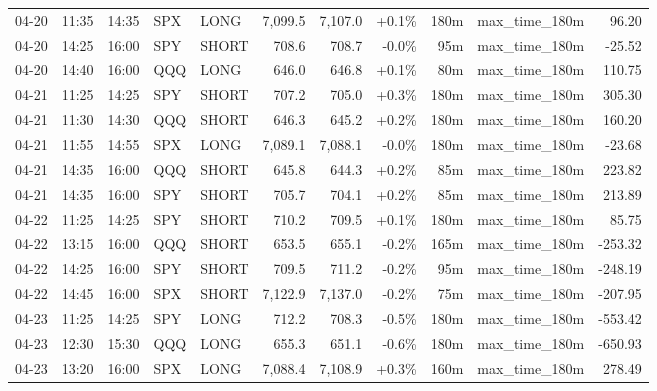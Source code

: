 \documentclass[11pt,a4paper,twoside]{article}
\begin{document}
\begin{center}
\begin{longtable}{>{\color{txtmain}}l l l l l r r r r >{\color{txtmain}}l r}
04-20 & 11:35 & 14:35 & SPX & LONG & 7,099.5 & 7,107.0 & \textcolor{wingreen}{+0.1\%} & 180m & max\_time\_180m & \textcolor{wingreen}{96.20} \\
04-20 & 14:25 & 16:00 & SPY & SHORT & 708.6 & 708.7 & \textcolor{lossred}{-0.0\%} & 95m & max\_time\_180m & \textcolor{lossred}{-25.52} \\
04-20 & 14:40 & 16:00 & QQQ & LONG & 646.0 & 646.8 & \textcolor{wingreen}{+0.1\%} & 80m & max\_time\_180m & \textcolor{wingreen}{110.75} \\
04-21 & 11:25 & 14:25 & SPY & SHORT & 707.2 & 705.0 & \textcolor{wingreen}{+0.3\%} & 180m & max\_time\_180m & \textcolor{wingreen}{305.30} \\
04-21 & 11:30 & 14:30 & QQQ & SHORT & 646.3 & 645.2 & \textcolor{wingreen}{+0.2\%} & 180m & max\_time\_180m & \textcolor{wingreen}{160.20} \\
04-21 & 11:55 & 14:55 & SPX & LONG & 7,089.1 & 7,088.1 & \textcolor{lossred}{-0.0\%} & 180m & max\_time\_180m & \textcolor{lossred}{-23.68} \\
04-21 & 14:35 & 16:00 & QQQ & SHORT & 645.8 & 644.3 & \textcolor{wingreen}{+0.2\%} & 85m & max\_time\_180m & \textcolor{wingreen}{223.82} \\
04-21 & 14:35 & 16:00 & SPY & SHORT & 705.7 & 704.1 & \textcolor{wingreen}{+0.2\%} & 85m & max\_time\_180m & \textcolor{wingreen}{213.89} \\
04-22 & 11:25 & 14:25 & SPY & SHORT & 710.2 & 709.5 & \textcolor{wingreen}{+0.1\%} & 180m & max\_time\_180m & \textcolor{wingreen}{85.75} \\
04-22 & 13:15 & 16:00 & QQQ & SHORT & 653.5 & 655.1 & \textcolor{lossred}{-0.2\%} & 165m & max\_time\_180m & \textcolor{lossred}{-253.32} \\
04-22 & 14:25 & 16:00 & SPY & SHORT & 709.5 & 711.2 & \textcolor{lossred}{-0.2\%} & 95m & max\_time\_180m & \textcolor{lossred}{-248.19} \\
04-22 & 14:45 & 16:00 & SPX & SHORT & 7,122.9 & 7,137.0 & \textcolor{lossred}{-0.2\%} & 75m & max\_time\_180m & \textcolor{lossred}{-207.95} \\
04-23 & 11:25 & 14:25 & SPY & LONG & 712.2 & 708.3 & \textcolor{lossred}{-0.5\%} & 180m & max\_time\_180m & \textcolor{lossred}{-553.42} \\
04-23 & 12:30 & 15:30 & QQQ & LONG & 655.3 & 651.1 & \textcolor{lossred}{-0.6\%} & 180m & max\_time\_180m & \textcolor{lossred}{-650.93} \\
04-23 & 13:20 & 16:00 & SPX & LONG & 7,088.4 & 7,108.9 & \textcolor{wingreen}{+0.3\%} & 160m & max\_time\_180m & \textcolor{wingreen}{278.49} \\

\end{longtable}
\end{center}
\end{document}
